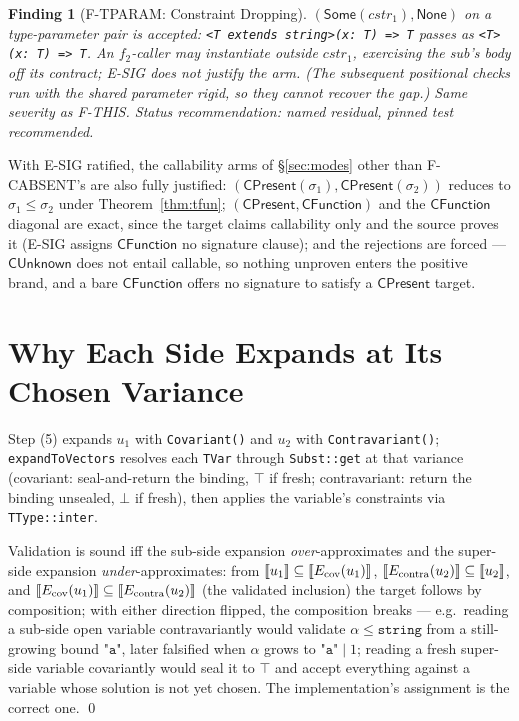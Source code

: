 \documentclass[11pt]{article}
\newtheorem{finding}[theorem]{Finding}
\begin{document}
\begin{finding}[F-TPARAM: Constraint Dropping]
\label{find:tparam}
$(\mathsf{Some}(\mathit{cstr}_1), \mathsf{None})$ on a type-parameter
pair is accepted: \texttt{<T extends string>(x: T) => T} passes as
\texttt{<T>(x: T) => T}. An $f_2$-caller may instantiate outside
$\mathit{cstr}_1$, exercising the sub's body off its contract; E-SIG
does not justify the arm. (The subsequent positional checks run with
the shared parameter \emph{rigid}, so they cannot recover the gap.)
Same severity as F-THIS. Status recommendation: named residual,
pinned test recommended.
\end{finding}

\noindent
With E-SIG ratified, the callability arms of \S\ref{sec:modes} other
than F-CABSENT's are also fully justified:
$(\mathsf{CPresent}(\sigma_1), \mathsf{CPresent}(\sigma_2))$ reduces to
$\sigma_1 \leq \sigma_2$ under Theorem~\ref{thm:tfun};
$(\mathsf{CPresent}, \mathsf{CFunction})$ and the
$\mathsf{CFunction}$ diagonal are exact, since the target claims
callability only and the source proves it (E-SIG assigns
$\mathsf{CFunction}$ no signature clause); and the rejections are
forced --- $\mathsf{CUnknown}$ does not entail callable, so nothing
unproven enters the positive brand, and a bare $\mathsf{CFunction}$
offers no signature to satisfy a $\mathsf{CPresent}$ target.

\section{Why Each Side Expands at Its Chosen Variance}
\label{sec:variance}

Step (5) expands $u_1$ with \texttt{Covariant()} and $u_2$ with
\texttt{Contravariant()}; \texttt{expandToVectors} resolves each
\texttt{TVar} through \texttt{Subst::get} at that variance
(covariant: seal-and-return the binding, $\top$ if fresh; contravariant:
return the binding unsealed, $\bot$ if fresh), then applies the
variable's constraints via \texttt{TType::inter}.

\begin{lemma}
\label{lem:variance}
Validation is sound iff the sub-side expansion \emph{over}-approximates
and the super-side expansion \emph{under}-approximates: from
$\llbracket u_1 \rrbracket \subseteq \llbracket E_{\mathrm{cov}}(u_1) \rrbracket$,
$\llbracket E_{\mathrm{contra}}(u_2) \rrbracket \subseteq \llbracket u_2 \rrbracket$, and
$\llbracket E_{\mathrm{cov}}(u_1) \rrbracket \subseteq \llbracket E_{\mathrm{contra}}(u_2) \rrbracket$
(the validated inclusion) the target follows by composition; with either
direction flipped, the composition breaks --- e.g.\ reading a sub-side
open variable contravariantly would validate
$\alpha \leq \texttt{string}$ from a still-growing bound
$\texttt{"a"}$, later falsified when $\alpha$ grows to
$\texttt{"a"} \mid 1$; reading a fresh super-side variable covariantly
would seal it to $\top$ and accept everything against a variable whose
solution is not yet chosen. The implementation's assignment is the
correct one. \qed
\end{lemma}
\end{document}
